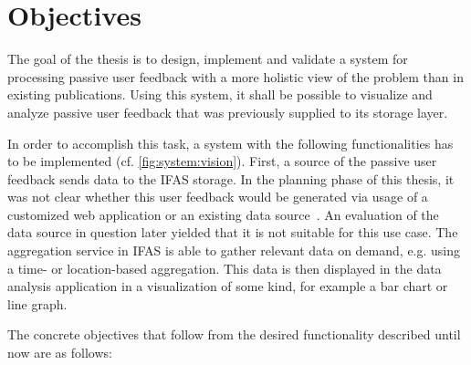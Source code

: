 
\section{Objectives}
\label{sec:intro:objectives}


The goal of the thesis is to design, implement and validate a system for processing passive user feedback with a more holistic view of the problem than in existing publications.
Using this system, it shall be possible to visualize and analyze passive user feedback that was previously supplied to its storage layer.

In order to accomplish this task, a system with the following functionalities has to be implemented (cf. \cref{fig:system:vision}).
First, a source of the passive user feedback sends data to the \ac{IFAS} storage.
In the planning phase of this thesis, it was not clear whether this user feedback would be generated via usage of a customized web application or an existing data source~\cite{Deka:2017:Rico}.
An evaluation of the data source in question later yielded that it is not suitable for this use case.
The aggregation service in \ac{IFAS} is able to gather relevant data on demand, e.g. using a time- or location-based aggregation.
This data is then displayed in the data analysis application in a visualization of some kind, for example a bar chart or line graph.

The concrete objectives that follow from the desired functionality described until now are as follows:

